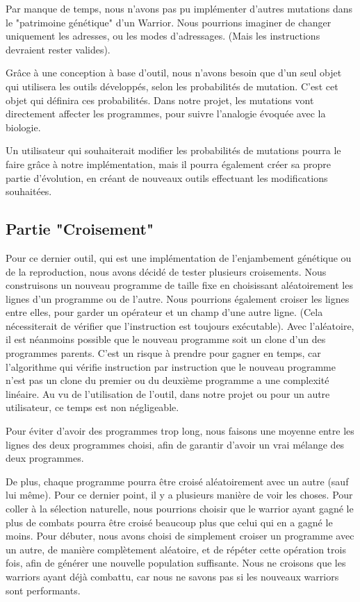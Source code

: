 \documentclass[hidelinks]{report}
\begin{document}
Par manque de temps, nous n'avons pas pu implémenter d'autres mutations dans le "patrimoine génétique" d'un Warrior. Nous pourrions imaginer de changer uniquement les adresses, ou les modes d'adressages. (Mais les instructions devraient rester valides).

Grâce à une conception à base d'outil, nous n'avons besoin que d'un seul objet qui utilisera les outils développés, selon les probabilités de mutation. C'est cet objet qui définira ces probabilités. Dans notre projet, les mutations vont directement affecter les programmes, pour suivre l'analogie évoquée avec la biologie.  

Un utilisateur qui souhaiterait modifier les probabilités de mutations pourra le faire grâce à notre implémentation, mais il pourra également créer sa propre partie d'évolution, en créant de nouveaux outils effectuant les modifications souhaitées.


\subsection{Partie "Croisement"}

Pour ce dernier outil, qui est une implémentation de l'enjambement génétique  ou de la reproduction, nous avons décidé de tester plusieurs croisements. Nous construisons un nouveau programme de taille fixe en choisissant aléatoirement les lignes d'un programme ou de l'autre. Nous pourrions également croiser les lignes entre elles, pour garder un opérateur et un champ d'une autre ligne. (Cela nécessiterait de vérifier que l'instruction est toujours exécutable). Avec l'aléatoire, il est néanmoins possible que le nouveau programme soit un clone d'un des programmes parents. C'est un risque à prendre pour gagner en temps, car l'algorithme qui vérifie instruction par instruction que le nouveau programme n'est pas un clone du premier ou du deuxième programme a une complexité linéaire. Au vu de l'utilisation de l'outil, dans notre projet ou pour un autre utilisateur, ce temps est non négligeable.

Pour éviter d'avoir des programmes trop long, nous faisons une moyenne entre les lignes des deux programmes choisi, afin de garantir d'avoir un vrai mélange des deux programmes.

De plus, chaque programme pourra être croisé aléatoirement avec un autre (sauf lui même). Pour ce dernier point, il y a plusieurs manière de voir les choses. Pour coller à la sélection naturelle, nous pourrions choisir que le warrior ayant gagné le plus de combats pourra être croisé beaucoup plus que celui qui en a gagné le moins. Pour débuter, nous avons choisi de simplement croiser un programme avec un autre, de manière complètement aléatoire, et de répéter cette opération trois fois, afin de générer une nouvelle population suffisante. Nous ne croisons que les warriors ayant déjà combattu, car nous ne savons pas si les nouveaux warriors sont performants.
\end{document}
